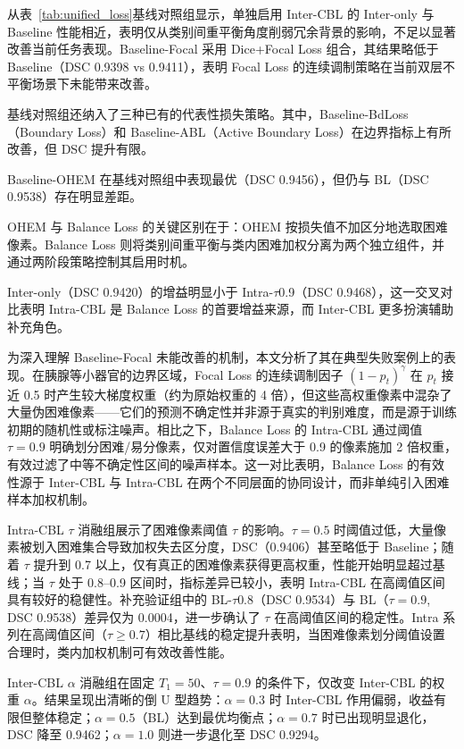 从表~\ref{tab:unified_loss}基线对照组显示，单独启用 Inter-CBL 的 Inter-only 与 Baseline 性能相近，表明仅从类别间重平衡角度削弱冗余背景的影响，不足以显著改善当前任务表现。Baseline-Focal 采用 Dice+Focal Loss 组合，其结果略低于 Baseline（DSC 0.9398 vs 0.9411），表明 Focal Loss 的连续调制策略在当前双层不平衡场景下未能带来改善。

基线对照组还纳入了三种已有的代表性损失策略。其中，Baseline-BdLoss（Boundary Loss）和 Baseline-ABL（Active Boundary Loss）在边界指标上有所改善，但 DSC 提升有限。

Baseline-OHEM 在基线对照组中表现最优（DSC 0.9456），但仍与 BL（DSC 0.9538）存在明显差距。

OHEM 与 Balance Loss 的关键区别在于：OHEM 按损失值不加区分地选取困难像素。Balance Loss 则将类别间重平衡与类内困难加权分离为两个独立组件，并通过两阶段策略控制其启用时机。

Inter-only（DSC 0.9420）的增益明显小于 Intra-$\tau$0.9（DSC 0.9468），这一交叉对比表明 Intra-CBL 是 Balance Loss 的首要增益来源，而 Inter-CBL 更多扮演辅助补充角色。

为深入理解 Baseline-Focal 未能改善的机制，本文分析了其在典型失败案例上的表现。在胰腺等小器官的边界区域，Focal Loss 的连续调制因子 $(1-p_t)^\gamma$ 在 $p_t$ 接近 0.5 时产生较大梯度权重（约为原始权重的 4 倍），但这些高权重像素中混杂了大量伪困难像素——它们的预测不确定性并非源于真实的判别难度，而是源于训练初期的随机性或标注噪声。相比之下，Balance Loss 的 Intra-CBL 通过阈值 $\tau{=}0.9$ 明确划分困难/易分像素，仅对置信度误差大于 0.9 的像素施加 2 倍权重，有效过滤了中等不确定性区间的噪声样本。这一对比表明，Balance Loss 的有效性源于 Inter-CBL 与 Intra-CBL 在两个不同层面的协同设计，而非单纯引入困难样本加权机制。

Intra-CBL $\tau$ 消融组展示了困难像素阈值 $\tau$ 的影响。$\tau=0.5$ 时阈值过低，大量像素被划入困难集合导致加权失去区分度，DSC（0.9406）甚至略低于 Baseline；随着 $\tau$ 提升到 0.7 以上，仅有真正的困难像素获得更高权重，性能开始明显超过基线；当 $\tau$ 处于 0.8--0.9 区间时，指标差异已较小，表明 Intra-CBL 在高阈值区间具有较好的稳健性。补充验证组中的 BL-$\tau$0.8（DSC 0.9534）与 BL（$\tau=0.9$, DSC 0.9538）差异仅为 0.0004，进一步确认了 $\tau$ 在高阈值区间的稳定性。Intra 系列在高阈值区间（$\tau \geq 0.7$）相比基线的稳定提升表明，当困难像素划分阈值设置合理时，类内加权机制可有效改善性能。

Inter-CBL $\alpha$ 消融组在固定 $T_1{=}50$、$\tau{=}0.9$ 的条件下，仅改变 Inter-CBL 的权重 $\alpha$。结果呈现出清晰的倒 U 型趋势：$\alpha=0.3$ 时 Inter-CBL 作用偏弱，收益有限但整体稳定；$\alpha=0.5$（BL）达到最优均衡点；$\alpha=0.7$ 时已出现明显退化，DSC 降至 0.9462；$\alpha=1.0$ 则进一步退化至 DSC 0.9294。

